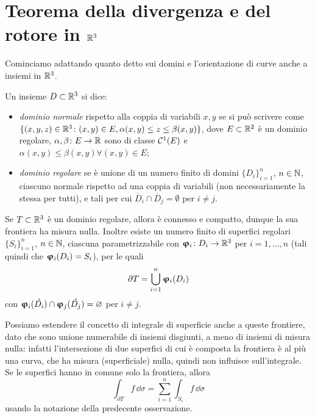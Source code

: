 \section{Teorema della divergenza e del rotore in $\mathbb{R}^3$}
Cominciamo adattando quanto detto sui domini e l'orientazione di curve anche a insiemi in $\mathbb{R}^3$.
\begin{definizione} \label{d:dominio-R3}
	Un insieme $D\subset\mathbb{R}^3$ si dice:
	\begin{itemize}
		\item \emph{dominio normale} rispetto alla coppia di variabili $x,y$ se si può scrivere come $\{(x,y,z)\in\mathbb{R}^3\colon(x,y)\in E, \alpha(x,y)\leq z\leq\beta(x,y)\}$, dove $E\subset\mathbb{R}^2$ è un dominio regolare, $\alpha,\beta\colon E\to\mathbb{R}$ sono di classe $\mathcal{C}^{{1}}(E)$ e $\alpha(x,y)\leq\beta(x,y)\forall(x,y)\in E$;
		\item \emph{dominio regolare} se è unione di un numero finito di domini $\{D_i\}_{i=1}^n$, $n\in\mathbb{N}$, ciascuno normale rispetto ad una coppia di variabili (non necessariamente la stessa per tutti), e tali per cui $\mathring{D_i}\cap\mathring{D_j}=\emptyset$ per $i\neq j$.
	\end{itemize}
\end{definizione}
\begin{osservazione}
	Se $T\subset\mathbb{R}^3$ è un dominio regolare, allora è connesso e compatto, dunque la sua frontiera ha misura nulla.
	Inoltre esiste un numero finito di superfici regolari $\{S_i\}_{i=1}^n$, $n\in\mathbb{N}$, ciascuna parametrizzabile con $\bm{\upvarphi}_i\colon D_i\to\mathbb{R}^3$ per $i=1,\dots,n$ (tali quindi che $\bm{\upvarphi}_i(D_i)=S_i$), per le quali
	\begin{equation*}
		\partial T=\bigcup_{i=1}^n\bm{\upvarphi}_i(D_i)
	\end{equation*}
	con $\bm{\upvarphi}_i(\mathring{D_i})\cap\bm{\upvarphi}_j(\mathring{D_j})=\varnothing$ per $i\neq j$.
\end{osservazione}
Possiamo estendere il concetto di integrale di superficie anche a queste frontiere, dato che sono unione numerabile di insiemi disgiunti, a meno di insiemi di misura nulla: infatti l'intersezione di due superfici di cui è composta la frontiera è al più una curva, che ha misura (superficiale) nulla, quindi non influisce sull'integrale.
Se le superfici hanno in comune solo la frontiera, allora
\begin{equation*}
	\int_{\partial T}f\,\dd\sigma=\sum_{i=1}^n\int_{S_i}f\,\dd\sigma
\end{equation*}
usando la notazione della predecente osservazione.

